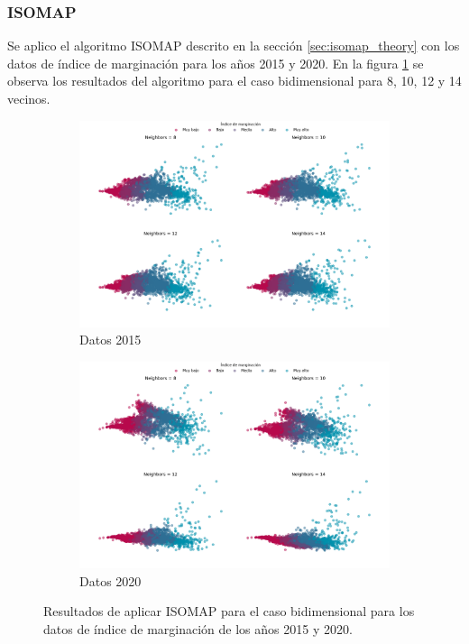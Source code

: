 \subsubsection{ISOMAP}

Se aplico el algoritmo ISOMAP descrito en la sección \ref{sec:isomap_theory} con los datos de índice de marginación para los años 2015 y 2020. En la figura \ref{fig:isompa_2d} se observa los resultados del algoritmo para el caso bidimensional para 8, 10, 12 y 14 vecinos.

\begin{figure}[H]
    \centering
    \begin{subfigure}{8.4cm}
        \includegraphics[width=1\linewidth]{Graphics/Data_2015/ISOMAP_2D.png}
        \caption{Datos 2015}
    \end{subfigure}
    \begin{subfigure}{8.4cm}
        \includegraphics[width=1\linewidth]{Graphics/Data_2020/ISOMAP_2D.png}
        \caption{Datos 2020}
    \end{subfigure}
    \caption{Resultados de aplicar ISOMAP para el caso bidimensional para los datos de índice de marginación de los años 2015 y 2020.}
    \label{fig:isompa_2d}
\end{figure}

